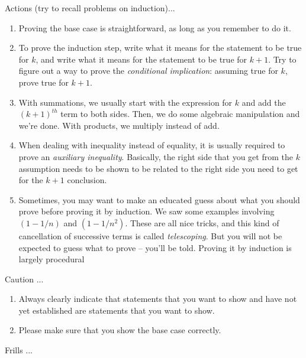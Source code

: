 \documentclass{amsart}
\begin{document}
Actions (try to recall problems on induction)...

\begin{enumerate}

\item Proving the base case is straightforward, as long as you
  remember to do it.
\item To prove the induction step, write what it means for the
  statement to be true for $k$, and write what it means for the
  statement to be true for $k + 1$. Try to figure out a way to prove
  the {\em conditional implication}: assuming true for $k$, prove true
  for $k + 1$.
\item With summations, we usually start with the expression for $k$
  and add the $(k+1)^{th}$ term to both sides. Then, we do some
  algebraic manipulation and we're done. With products, we multiply
  instead of add.
\item When dealing with inequality instead of equality, it is usually
  required to prove an {\em auxiliary inequality}. Basically, the
  right side that you get from the $k$ assumption needs to be shown to
  be related to the right side you need to get for the $k + 1$
  conclusion.
\item Sometimes, you may want to make an educated guess about what you
  should prove before proving it by induction. We saw some examples
  involving $(1-1/n)$ and $(1 - 1/n^2)$. These are all nice tricks,
  and this kind of cancellation of successive terms is called {\em
  telescoping}. But you will not be expected to guess what to prove --
  you'll be told. Proving it by induction is largely procedural
\end{enumerate}

Caution ...

\begin{enumerate}
\item Always clearly indicate that statements that you want to show
  and have not yet established are statements that you want to show.
\item Please make sure that you show the base case correctly.
\end{enumerate} 

Frills ...
\end{document}
